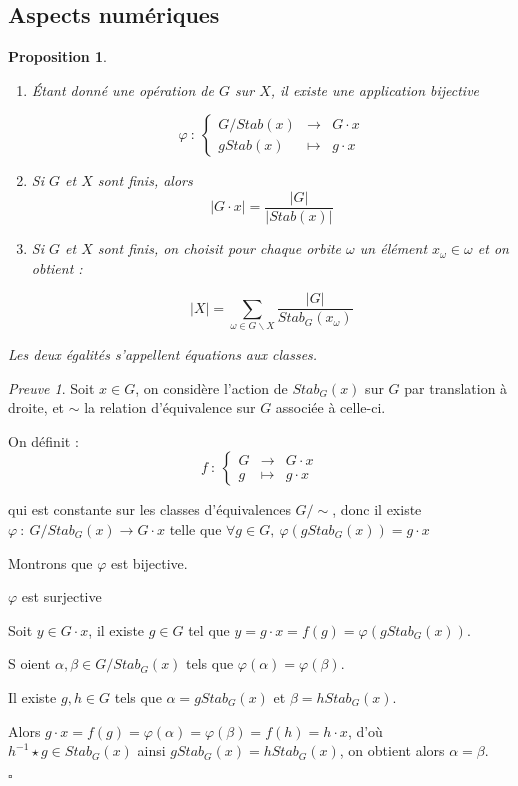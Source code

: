\documentclass[]{article}
\newtheorem{myproposition}{Proposition}
\theoremstyle{remark}
\newtheorem{myproof}{Preuve}
\theoremstyle{definition}
\newcommand{\cqfd}{
	\hfill$\square$
}
\newcommand{\func}[5]{
#1 ~ : ~ \left\{ \begin{array}{lcl}
	#2 & \longrightarrow & #3 \\
	#4 & \longmapsto & #5
\end{array}
\right.
}
\newcommand{\funcshort}[3]{
#1 ~ : ~ #2 \longrightarrow #3
}
\newenvironment{proofpart}[1]{
	\noindent
	{\boldmath #1}
}{
	\checkmark
}
\begin{document}
\subsection{Aspects numériques}

\begin{myproposition}
	\begin{enumerate}
		\item Étant donné une opération de $G$ sur $X$, il existe une application bijective
		
		$$\func{\varphi}{G/Stab(x)}{G \cdot x}{g Stab(x)}{g \cdot x}$$
		
		\item Si $G$ et $X$ sont finis, alors $$|G \cdot x| = \frac{|G|}{|Stab(x)|}$$
		
		\item Si $G$ et $X$ sont finis, on choisit pour chaque orbite $\omega$ un élément $x_\omega \in \omega$ et on obtient :
		
		$$|X| = \sum_{\omega \in G \backslash X} \frac{|G|}{Stab_G(x_\omega)}$$
	\end{enumerate}
	
	Les deux égalités s'appellent \textit{équations aux classes}.
\end{myproposition}

\begin{myproof}
	Soit $x \in G$, on considère l'action de $Stab_G(x)$ sur $G$ par translation à droite, et $\sim$ la relation d'équivalence sur $G$ associée à celle-ci.
	
	On définit : $$\func{f}{G}{G \cdot x}{g}{g \cdot x}$$
	
	qui est constante sur les classes d'équivalences $G/\sim$, donc il existe $\funcshort{\varphi}{G/Stab_G(x)}{G \cdot x}$ telle que $\forall g \in G, ~ \varphi(gStab_G(x))=g \cdot x$
	
	Montrons que $\varphi$ est bijective.
	
	\begin{proofpart}{$\varphi$ est surjective}
		Soit $y \in G \cdot x$, il existe $g \in G$ tel que $y = g \cdot x = f(g) = \varphi(g Stab_G(x))$.
	\end{proofpart}
	
	\begin{proofpart}
		Soient $\alpha, \beta \in G/Stab_G(x)$ tels que $\varphi(\alpha) = \varphi(\beta)$.
		
		Il existe $g, h \in G$ tels que $\alpha = g Stab_G(x)$ et $\beta = h Stab_G(x)$.
		
		Alors $g \cdot x=f(g)=\varphi(\alpha)=\varphi(\beta)=f(h)=h \cdot x$, d'où $h^{-1} \star g \in Stab_G(x)$ ainsi $gStab_G(x)=hStab_G(x)$, on obtient alors $\alpha = \beta$.
	\end{proofpart}
	
	\cqfd
\end{myproof}
\end{document}
